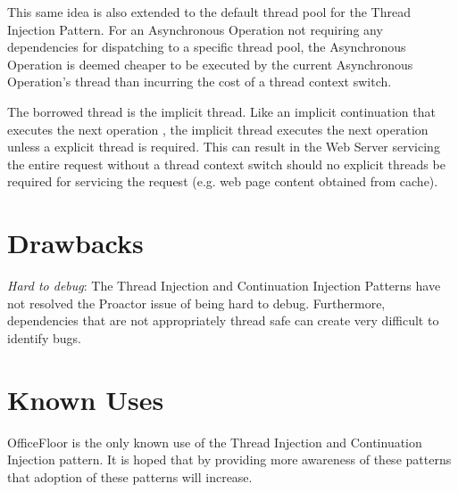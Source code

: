 \documentclass{article}
\begin{document}
This same idea is also extended to the default thread pool for the Thread
Injection Pattern.  For an Asynchronous Operation not requiring any dependencies
for dispatching to a specific thread pool, the Asynchronous Operation is deemed
cheaper to be executed by the current Asynchronous Operation's thread than
incurring the cost of a thread context switch.

The borrowed thread is the implicit thread.  Like an implicit continuation that
executes the next operation \cite{continuations}, the implicit thread executes
the next operation unless a explicit thread is required.  This can result in the
Web Server servicing the entire request without a thread context switch should
no explicit threads be required for servicing the request (e.g. web page content
obtained from cache).


\section{Drawbacks}

\emph{Hard to debug}: The Thread Injection and Continuation Injection Patterns
have not resolved the Proactor issue of being hard to debug.  Furthermore,
dependencies that are not appropriately thread safe can create very difficult to
identify bugs.

\section{Known Uses}

OfficeFloor is the only known use of the Thread Injection and Continuation
Injection pattern.  It is hoped that by providing more awareness of these
patterns that adoption of these patterns will increase.




\end{document}
